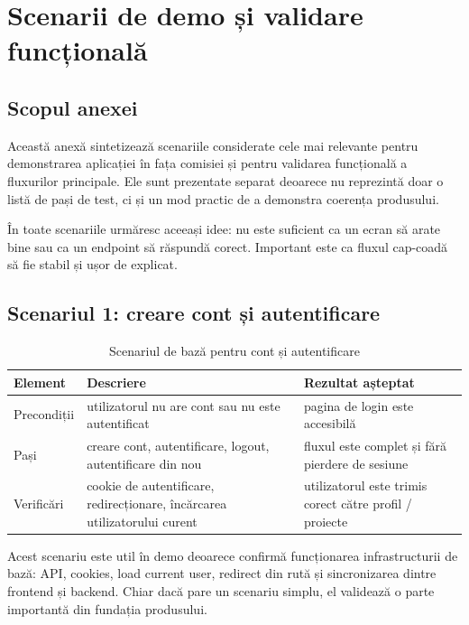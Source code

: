 \chapter{Scenarii de demo și validare funcțională}

\section{Scopul anexei}

Această anexă sintetizează scenariile considerate cele mai relevante pentru demonstrarea aplicației în fața comisiei și pentru validarea funcțională a fluxurilor principale. Ele sunt prezentate separat deoarece nu reprezintă doar o listă de pași de test, ci și un mod practic de a demonstra coerența produsului.

În toate scenariile urmăresc aceeași idee: nu este suficient ca un ecran să arate bine sau ca un endpoint să răspundă corect. Important este ca fluxul cap-coadă să fie stabil și ușor de explicat.

\section{Scenariul 1: creare cont și autentificare}

\begin{table}[!htbp]
  \centering
  \caption{Scenariul de bază pentru cont și autentificare}
  \renewcommand{\arraystretch}{1.15}
  \begin{tabularx}{\textwidth}{>{\RaggedRight\arraybackslash}p{3.2cm}YY}
    \toprule
    \textbf{Element} & \textbf{Descriere} & \textbf{Rezultat așteptat} \\
    \midrule
    Precondiții & utilizatorul nu are cont sau nu este autentificat & pagina de login este accesibilă \\
    Pași & creare cont, autentificare, logout, autentificare din nou & fluxul este complet și fără pierdere de sesiune \\
    Verificări & cookie de autentificare, redirecționare, încărcarea utilizatorului curent & utilizatorul este trimis corect către profil / proiecte \\
    \bottomrule
  \end{tabularx}
\end{table}

Acest scenariu este util în demo deoarece confirmă funcționarea infrastructurii de bază: API, cookies, load current user, redirect din rută și sincronizarea dintre frontend și backend. Chiar dacă pare un scenariu simplu, el validează o parte importantă din fundația produsului.

